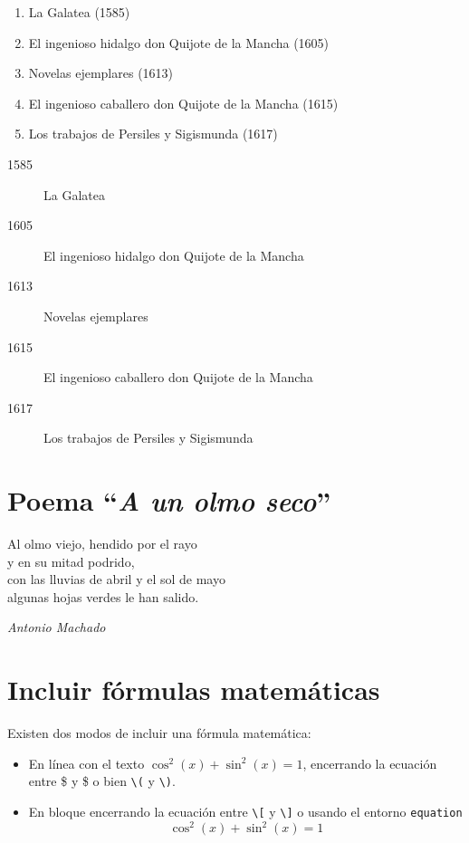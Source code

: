 \documentclass[a4paper, 12pt, twoside]{article} %
\begin{document}
\begin{enumerate}
  \item La Galatea (1585)
  \item El ingenioso hidalgo don Quijote de la Mancha (1605)
  \item Novelas ejemplares (1613)
  \item El ingenioso caballero don Quijote de la Mancha (1615)
  \item Los trabajos de Persiles y Sigismunda (1617)
\end{enumerate}

\begin{description}
  \item[1585] La Galatea 
  \item[1605] El ingenioso hidalgo don Quijote de la Mancha 
  \item[1613] Novelas ejemplares 
  \item[1615] El ingenioso caballero don Quijote de la Mancha 
  \item[1617] Los trabajos de Persiles y Sigismunda 
\end{description}
\section{Poema ``\emph{A un olmo seco}''}

\begin{flushleft}
Al olmo viejo, hendido por el rayo \\
y en su mitad podrido,\\
con las lluvias de abril y el sol de mayo\\
algunas hojas verdes le han salido.
\medskip

\emph{Antonio Machado}
\end{flushleft}

\section{Incluir fórmulas matemáticas}

Existen dos modos de incluir una fórmula matemática: 
\begin{itemize}
  \item En línea con el texto $\cos^2(x) + \sin^2(x) = 1$, encerrando la ecuación entre \$ y \$ o bien \verb+\(+ y \verb+\)+.
  \item En bloque encerrando la ecuación entre \verb+\[+ y \verb+\]+ o usando el entorno \texttt{equation}
    \[
    \cos^2(x) + \sin^2(x) = 1
    \] 
    
\end{itemize}
\end{document}
